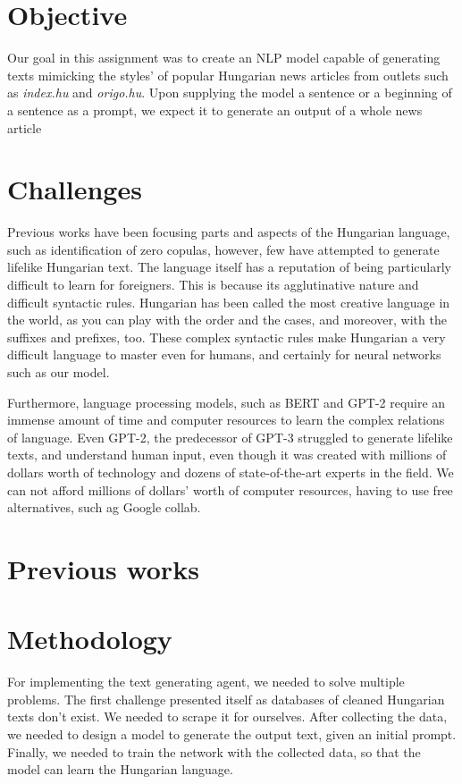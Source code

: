 \documentclass[journal]{IEEEtai}
\begin{document}
\section{Objective}
Our goal in this assignment was to create an NLP model capable of generating texts mimicking  the styles' of popular Hungarian news articles from outlets such as {\it index.hu} and {\it origo.hu}. Upon supplying the model a sentence or a beginning of a sentence as a prompt, we expect it to generate an output of a whole news article

\section{Challenges}
Previous works have been focusing parts and aspects of the Hungarian language, such as identification of zero copulas\cite{Dmtr2020MuchAA}, however, few have attempted to generate lifelike Hungarian text. The language itself has a reputation of being particularly difficult to learn for foreigners. This is because its agglutinative nature and difficult syntactic rules. Hungarian has been called the most creative language in the world, as you can play with the order and the cases, and moreover, with the suffixes and prefixes, too. These complex syntactic rules make Hungarian a very difficult language to master even for humans, and certainly for neural networks such as our model.

Furthermore, language processing models, such as BERT and GPT-2 require an immense amount of time and computer resources to learn the complex relations of language. Even GPT-2, the predecessor of GPT-3 struggled to generate lifelike texts, and understand human input, even though it was created with millions of dollars worth of technology and dozens of state-of-the-art experts in the field. We can not afford millions of dollars' worth of computer resources, having to use free alternatives, such ag Google collab.

\section{Previous works}



\section{Methodology}
For implementing the text generating agent, we needed to solve multiple problems. The first challenge presented itself as databases of cleaned Hungarian texts don't exist. We needed to scrape it for ourselves. After collecting the data, we needed to design a model to generate the output text, given an initial prompt. Finally, we needed to train the network with the collected data, so that the model can learn the Hungarian language.  
\end{document}
